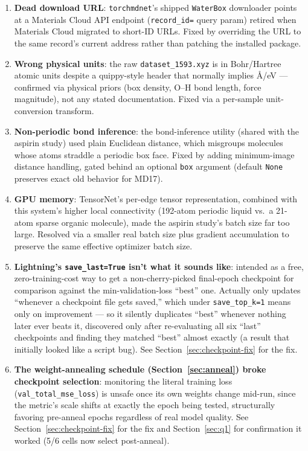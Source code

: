 \documentclass[11pt]{article}
\begin{document}
\begin{enumerate}
  \item \textbf{Dead download URL}: \texttt{torchmdnet}'s shipped
  \texttt{WaterBox} downloader points at a Materials Cloud API endpoint
  (\texttt{record\_id=} query param) retired when Materials Cloud migrated
  to short-ID URLs. Fixed by overriding the URL to the same record's current
  address rather than patching the installed package.
  \item \textbf{Wrong physical units}: the raw \texttt{dataset\_1593.xyz} is
  in Bohr/Hartree atomic units despite a quippy-style header that normally
  implies \AA/eV --- confirmed via physical priors (box density, O--H bond
  length, force magnitude), not any stated documentation. Fixed via a
  per-sample unit-conversion transform.
  \item \textbf{Non-periodic bond inference}: the bond-inference utility
  (shared with the aspirin study) used plain Euclidean distance, which
  misgroups molecules whose atoms straddle a periodic box face. Fixed by
  adding minimum-image distance handling, gated behind an optional
  \texttt{box} argument (default \texttt{None} preserves exact old behavior
  for MD17).
  \item \textbf{GPU memory}: TensorNet's per-edge tensor representation,
  combined with this system's higher local connectivity (192-atom periodic
  liquid vs.\ a 21-atom sparse organic molecule), made the aspirin study's
  batch size far too large. Resolved via a smaller real batch size plus
  gradient accumulation to preserve the same effective optimizer batch size.
  \item \textbf{Lightning's \texttt{save\_last=True} isn't what it sounds
  like}: intended as a free, zero-training-cost way to get a
  non-cherry-picked final-epoch checkpoint for comparison against the
  min-validation-loss ``best'' one. Actually only updates ``whenever a
  checkpoint file gets saved,'' which under \texttt{save\_top\_k=1} means
  only on improvement --- so it silently duplicates ``best'' whenever
  nothing later ever beats it, discovered only after re-evaluating all six
  ``last'' checkpoints and finding they matched ``best'' almost exactly (a
  result that initially looked like a script bug). See
  Section~\ref{sec:checkpoint-fix} for the fix.
  \item \textbf{The weight-annealing schedule (Section~\ref{sec:anneal})
  broke checkpoint selection}: monitoring the literal training loss
  (\texttt{val\_total\_mse\_loss}) is unsafe once its own weights change
  mid-run, since the metric's scale shifts at exactly the epoch being
  tested, structurally favoring pre-anneal epochs regardless of real model
  quality. See Section~\ref{sec:checkpoint-fix} for the fix and
  Section~\ref{sec:q1} for confirmation it worked (5/6 cells now select
  post-anneal).
\end{enumerate}
\end{document}
